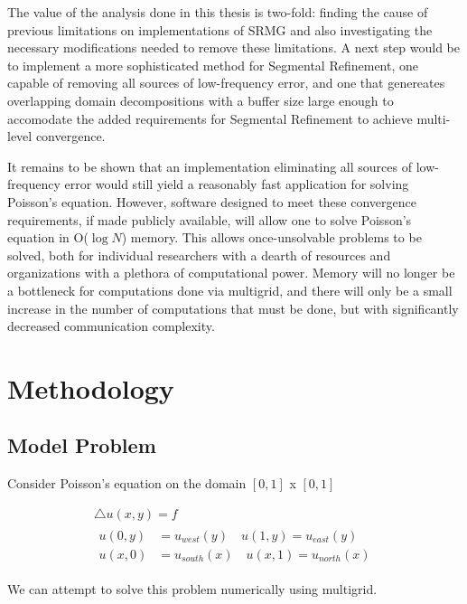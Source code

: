 \documentclass[final]{siamart1116}
\numberwithin{theorem}{section}
\begin{document}
    
    The value of the analysis done in this thesis is two-fold: finding the cause of previous limitations on implementations of SRMG and also investigating the necessary modifications needed to remove these limitations. A next step would be to implement a more sophisticated method for Segmental Refinement, one capable of removing all sources of low-frequency error, and one that genereates overlapping domain decompositions with a buffer size large enough to accomodate the added requirements for Segmental Refinement to achieve multi-level convergence.  
    
    It remains to be shown that an implementation eliminating all sources of low-frequency error would still yield a reasonably fast application for solving Poisson's equation. However, software designed to meet these convergence requirements, if made publicly available, will allow one to solve Poisson's equation in O($\log{N}$) memory.  This allows once-unsolvable problems to be solved, both for individual researchers with a dearth of resources and organizations with a plethora of computational power. Memory will no longer be a bottleneck for computations done via multigrid, and there will only be a small increase in the number of computations that must be done, but with significantly decreased communication complexity.
   

\section{Methodology}\label{sec:method}
\subsection{Model Problem}
Consider Poisson's equation on the domain $[0, 1]$ x $[0, 1]$

\begin{gather}
  \bigtriangleup  u(x,y) = f \label{eq:Poisson} \\
  \begin{split}
    u(0,y) &= u_{west}(y) \quad u(1,y) = u_{east}(y) \label{boundary} \\
    u(x,0) &= u_{south}(x) \quad u(x,1) = u_{north}(x) \nonumber
  \end{split}
\end{gather}


We can attempt to solve this problem numerically using multigrid. 
\end{document}
